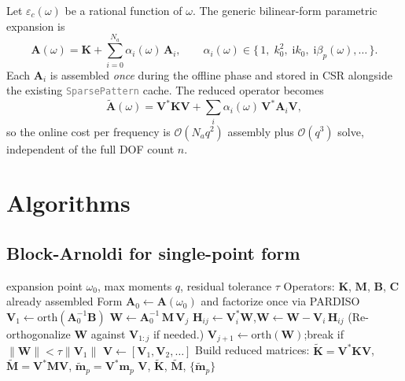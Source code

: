 \documentclass[11pt,a4paper]{article}
\newcommand{\im}{\mathrm{i}}
\begin{document}
Let $\varepsilon_c(\omega)$ be a rational function of $\omega$. The
generic bilinear-form parametric expansion is
\begin{equation}
  \bm A(\omega) = \bm K + \sum_{i=0}^{N_a} \alpha_i(\omega)\,\bm A_i,\qquad
  \alpha_i(\omega)\in\{\,1,\;k_0^2,\;\im k_0,\;\im\beta_p(\omega),\ldots\,\}.
\end{equation}
Each $\bm A_i$ is assembled \emph{once} during the offline phase and
stored in CSR alongside the existing
\textcolor{gray}{\texttt{SparsePattern}} cache. The reduced operator becomes
\begin{equation}
  \widetilde{\bm A}(\omega) = \bm V^{\!*}\bm K\bm V + \sum_i \alpha_i(\omega)\,
                              \bm V^{\!*}\bm A_i\bm V,
\end{equation}
so the online cost per frequency is $\mathcal{O}(N_a q^2)$ assembly plus
$\mathcal{O}(q^3)$ solve, independent of the full DOF count $n$.

\section{Algorithms}

\subsection{Block-Arnoldi for single-point form}

\begin{algorithm}[h]
\caption{Block-Arnoldi (single-point Krylov MOR)}
\label{alg:block-arnoldi}
\begin{algorithmic}[1]
\Require expansion point $\omega_0$, max moments $q$, residual tolerance $\tau$
\Statex Operators: $\bm K$, $\bm M$, $\bm B$, $\bm C$ already assembled
\State Form $\bm A_0 \gets \bm A(\omega_0)$ and factorize once via PARDISO
\State $\bm V_1 \gets \mathrm{orth}(\bm A_0^{-1} \bm B)$
  \State $\bm W \gets \bm A_0^{-1}\,\bm M\,\bm V_j$
    \State $\bm H_{ij}\gets \bm V_i^{\!*}\bm W$,\quad $\bm W\gets \bm W - \bm V_i\,\bm H_{ij}$ 
  \EndFor
  \State (Re-orthogonalize $\bm W$ against $\bm V_{1:j}$ if needed.)
  \State $\bm V_{j+1} \gets \mathrm{orth}(\bm W)$;\quad break if $\|\bm W\| < \tau\|\bm V_1\|$
\EndFor
\State $\bm V \gets [\bm V_1,\bm V_2,\ldots]$
\State Build reduced matrices: $\widetilde{\bm K}\!=\!\bm V^{\!*}\bm K\bm V$, $\widetilde{\bm M}\!=\!\bm V^{\!*}\bm M\bm V$, $\widetilde{\bm m}_p\!=\!\bm V^{\!*}\bm m_p$
\State \Return $\bm V$, $\widetilde{\bm K}$, $\widetilde{\bm M}$, $\{\widetilde{\bm m}_p\}$
\end{algorithmic}
\end{algorithm}
\end{document}
